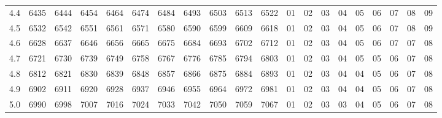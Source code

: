 \documentclass[12pt,UTF8]{ctexbook}
\begin{document}
\begin{appendix}
\begin{longtable}{|c| c c c c c | c c c c c| c c c c c c c c c|}
\scriptsize 4.4 & \scriptsize 6435 & \scriptsize 6444 & \scriptsize 6454 & \scriptsize 6464 & \scriptsize 6474 & \scriptsize 6484 & \scriptsize 6493 & \scriptsize 6503 & \scriptsize 6513 & \scriptsize 6522 & \scriptsize 01 & \scriptsize 02 & \scriptsize 03 & \scriptsize 04 & \scriptsize 05 & \scriptsize 06 & \scriptsize 07 & \scriptsize 08 & \scriptsize 09 \\
\scriptsize 4.5 & \scriptsize 6532 & \scriptsize 6542 & \scriptsize 6551 & \scriptsize 6561 & \scriptsize 6571 & \scriptsize 6580 & \scriptsize 6590 & \scriptsize 6599 & \scriptsize 6609 & \scriptsize 6618 & \scriptsize 01 & \scriptsize 02 & \scriptsize 03 & \scriptsize 04 & \scriptsize 05 & \scriptsize 06 & \scriptsize 07 & \scriptsize 08 & \scriptsize 09 \\
\scriptsize 4.6 & \scriptsize 6628 & \scriptsize 6637 & \scriptsize 6646 & \scriptsize 6656 & \scriptsize 6665 & \scriptsize 6675 & \scriptsize 6684 & \scriptsize 6693 & \scriptsize 6702 & \scriptsize 6712 & \scriptsize 01 & \scriptsize 02 & \scriptsize 03 & \scriptsize 04 & \scriptsize 05 & \scriptsize 06 & \scriptsize 07 & \scriptsize 07 & \scriptsize 08 \\
\scriptsize 4.7 & \scriptsize 6721 & \scriptsize 6730 & \scriptsize 6739 & \scriptsize 6749 & \scriptsize 6758 & \scriptsize 6767 & \scriptsize 6776 & \scriptsize 6785 & \scriptsize 6794 & \scriptsize 6803 & \scriptsize 01 & \scriptsize 02 & \scriptsize 03 & \scriptsize 04 & \scriptsize 05 & \scriptsize 05 & \scriptsize 06 & \scriptsize 07 & \scriptsize 08 \\
\scriptsize 4.8 & \scriptsize 6812 & \scriptsize 6821 & \scriptsize 6830 & \scriptsize 6839 & \scriptsize 6848 & \scriptsize 6857 & \scriptsize 6866 & \scriptsize 6875 & \scriptsize 6884 & \scriptsize 6893 & \scriptsize 01 & \scriptsize 02 & \scriptsize 03 & \scriptsize 04 & \scriptsize 04 & \scriptsize 05 & \scriptsize 06 & \scriptsize 07 & \scriptsize 08 \\
\scriptsize 4.9 & \scriptsize 6902 & \scriptsize 6911 & \scriptsize 6920 & \scriptsize 6928 & \scriptsize 6937 & \scriptsize 6946 & \scriptsize 6955 & \scriptsize 6964 & \scriptsize 6972 & \scriptsize 6981 & \scriptsize 01 & \scriptsize 02 & \scriptsize 03 & \scriptsize 04 & \scriptsize 04 & \scriptsize 05 & \scriptsize 06 & \scriptsize 07 & \scriptsize 08 \\
\scriptsize 5.0 & \scriptsize 6990 & \scriptsize 6998 & \scriptsize 7007 & \scriptsize 7016 & \scriptsize 7024 & \scriptsize 7033 & \scriptsize 7042 & \scriptsize 7050 & \scriptsize 7059 & \scriptsize 7067 & \scriptsize 01 & \scriptsize 02 & \scriptsize 03 & \scriptsize 03 & \scriptsize 04 & \scriptsize 05 & \scriptsize 06 & \scriptsize 07 & \scriptsize 08 \\

\end{longtable}
\end{appendix}
\end{document}

